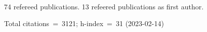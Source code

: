 74 refereed publications. 13 refeered publications as first author.

Total citations~=~3121; h-index~=~31 (2023-02-14)
